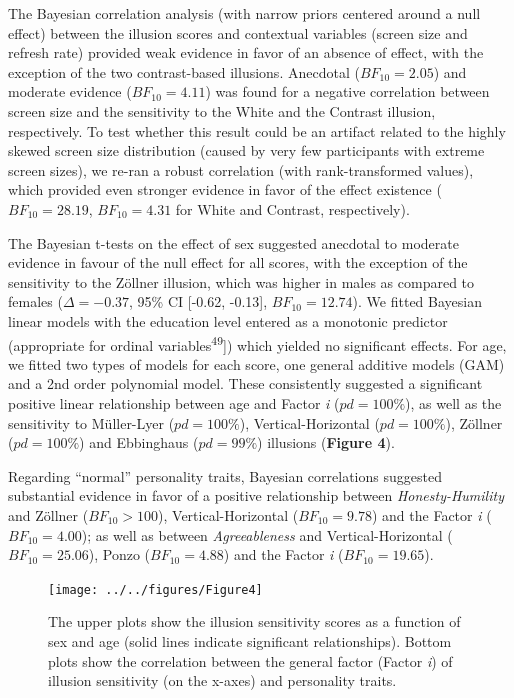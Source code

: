 \documentclass[
  man,floatsintext]{apa6}
\begin{document}
The Bayesian correlation analysis (with narrow priors centered around a null effect) between the illusion scores and contextual variables (screen size and refresh rate) provided weak evidence in favor of an absence of effect, with the exception of the two contrast-based illusions. Anecdotal (\(BF_{10} = 2.05\)) and moderate evidence (\(BF_{10} = 4.11\)) was found for a negative correlation between screen size and the sensitivity to the White and the Contrast illusion, respectively. To test whether this result could be an artifact related to the highly skewed screen size distribution (caused by very few participants with extreme screen sizes), we re-ran a robust correlation (with rank-transformed values), which provided even stronger evidence in favor of the effect existence (\(BF_{10} = 28.19\), \(BF_{10} = 4.31\) for White and Contrast, respectively).

The Bayesian t-tests on the effect of sex suggested anecdotal to moderate evidence in favour of the null effect for all scores, with the exception of the sensitivity to the Zöllner illusion, which was higher in males as compared to females (\(\Delta=-0.37\), 95\% CI {[}-0.62, -0.13{]}, \(BF_{10} = 12.74\)). We fitted Bayesian linear models with the education level entered as a monotonic predictor
(appropriate for ordinal variables\textsuperscript{49}{]})
which yielded no significant effects. For age, we fitted two types of models for each score, one general additive models (GAM) and a 2nd order polynomial model. These consistently suggested a significant positive linear relationship between age and Factor \emph{i} (\(pd=100\%\)), as well as the sensitivity to Müller-Lyer (\(pd=100\%\)), Vertical-Horizontal (\(pd=100\%\)), Zöllner (\(pd=100\%\)) and Ebbinghaus (\(pd=99\%\)) illusions (\textbf{Figure 4}).

Regarding ``normal'' personality traits, Bayesian correlations suggested substantial evidence in favor of a positive relationship between \emph{Honesty-Humility} and Zöllner (\(BF_{10} > 100\)), Vertical-Horizontal (\(BF_{10} = 9.78\)) and the Factor \emph{i} (\(BF_{10} = 4.00\)); as well as between \emph{Agreeableness} and Vertical-Horizontal (\(BF_{10} = 25.06\)), Ponzo (\(BF_{10} = 4.88\)) and the Factor \emph{i} (\(BF_{10} = 19.65\)).

\begin{figure}
\texttt{[image: ../../figures/Figure4]} \caption{The upper plots show the illusion sensitivity scores as a function of sex and age (solid lines indicate significant relationships). Bottom plots show the correlation between the general factor (Factor \textit{i}) of illusion sensitivity (on the x-axes) and personality traits.}\label{fig:unnamed-chunk-5}
\end{figure}
\end{document}

